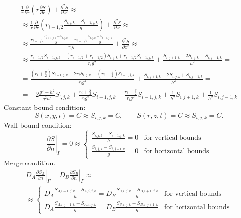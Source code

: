 \documentclass[a4paper,10pt]{article}
\begin{document}
\begin{multline}\label{eq.im2d.diffusion.cylindrical}
    \frac{1}{r} \frac{\partial}{\partial r}
    \left( r \frac{\partial S}{\partial r} \right) +
    \frac{\partial^2 S}{\partial z^2}
    \approx
    \\%
    \approx
    \frac{1}{r}\frac{\partial}{\partial r}\left(r_{i-1/2} \frac{S_{i,j,k} - S_{i-1,j,k}}{g} \right) +
    \frac{\partial^2 S}{\partial z^2}
    \approx
    \\%
    \approx
    \frac{ r_{i+1/2}\frac{S_{i+1,j,k} - S_{i,j,k}}{g} - r_{i-1/2}\frac{S_{i,j,k} - S_{i-1,j,k}}{g}}{r_i g} +
    \frac{\partial^2 S}{\partial z^2}
    \approx
    \\%
    \approx
    \frac{ r_{i+1/2}S_{i+1,j,k} - (r_{i+1/2} + r_{i-1/2})S_{i,j,k} + r_{i-1/2} S_{i-1,j,k} }{r_i g^2} +
    \frac{S_{i,j+1,k} - 2 S_{i,j,k} + S_{i,j-1,k}}{h^2}
    =
    \\%
    =
    \frac{ (r_i + \frac{g}{2})S_{i+1,j,k} - 2 r_i S_{i,j,k} + (r_i - \frac{g}{2}) S_{i-1,j,k} }{r_i g^2} +
    \frac{S_{i,j+1,k} - 2 S_{i,j,k} + S_{i,j-1,k}}{h^2}
    =
    \\%
    =
    -2\frac{g^2 + h^2}{g^2 h^2}         S_{i,j,k}
    +\frac{r_i + \frac{g}{2}}{r_i g^2}  S_{i+1,j,k}
    +\frac{r_i - \frac{g}{2}}{r_i g^2}  S_{i-1,j,k}
    +\frac{1}{h^2}                      S_{i,j+1,k}
    +\frac{1}{h^2}                      S_{i,j-1,k}
\end{multline}
%
%
%
Constant bound condition:
\begin{equation}
    S(x, y, t) = C \approx S_{i,j,k} = C,
    \qquad
    S(r, z, t) = C \approx S_{i,j,k} = C.
\end{equation}
Wall bound condition:
\begin{equation}
    \left.\frac{\partial S}{\partial n}\right|_{\Gamma} = 0
    \approx
    \begin{cases}
        \frac{S_{i,j,k} - S_{i+1,j,k}}{h} = 0 & \text{for vertical bounds}\\
        \frac{S_{i,j,k} - S_{i,j+1,k}}{g} = 0 & \text{for horizontal bounds}
    \end{cases}
\end{equation}
Merge condition:
\begin{multline}
    D_A \left.\frac{\partial S_A}{\partial n}\right|_{\Gamma} =
    D_B \left.\frac{\partial S_B}{\partial n}\right|_{\Gamma}
    \approx\\\approx
    \begin{cases}
        D_A \frac{S_{A,i-1,j,k} - S_{A,i,j,k}}{h} =
        D_B \frac{S_{B,i,j,k} - S_{B,i+1,j,k}}{h} & \text{for vertical bounds}\\
        D_A \frac{S_{A,i,j-1,k} - S_{A,i,j,k}}{g} =
        D_B \frac{S_{B,i,j,k} - S_{B,i,j+1,k}}{g} & \text{for horizontal bounds}
    \end{cases}
\end{multline}
\end{document}
